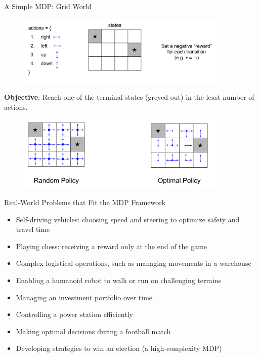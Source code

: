 \begin{frame}[allowframebreaks]{A Simple MDP: Grid World}

    \begin{figure}
        \centering
        \includegraphics[width=0.9\textwidth,height=0.9\textheight,keepaspectratio]{images/intro/mdp_1.png}
    \end{figure}

    \centering
    \textbf{Objective}: Reach one of the terminal states (greyed out) in the least number of actions.

\framebreak

    \begin{figure}
        \centering
        \includegraphics[width=0.9\textwidth,height=0.9\textheight,keepaspectratio]{images/intro/mdp_2.png}
    \end{figure}

\end{frame}

\begin{frame}{Real-World Problems that Fit the MDP Framework}
    \begin{itemize}
        \item Self-driving vehicles: choosing speed and steering to optimize safety and travel time
        \item Playing chess: receiving a reward only at the end of the game
        \item Complex logistical operations, such as managing movements in a warehouse
        \item Enabling a humanoid robot to walk or run on challenging terrains
        \item Managing an investment portfolio over time
        \item Controlling a power station efficiently
        \item Making optimal decisions during a football match
        \item Developing strategies to win an election (a high-complexity MDP)
    \end{itemize}
\end{frame}

